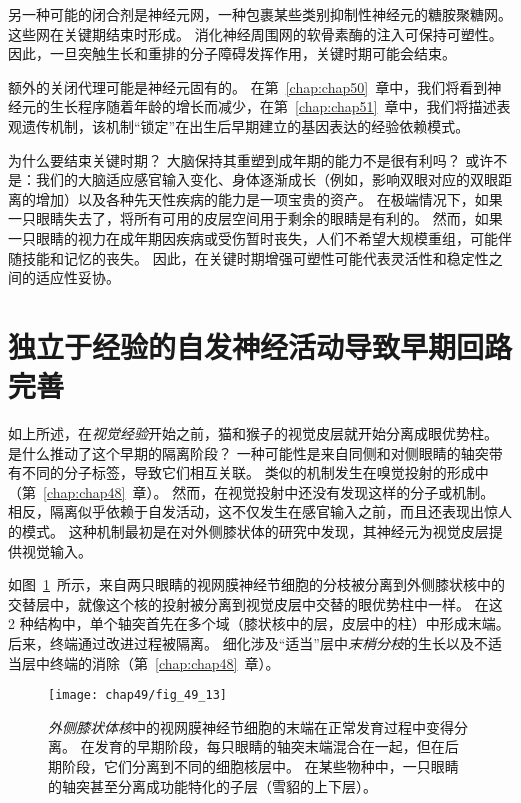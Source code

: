 另一种可能的闭合剂是神经元网，一种包裹某些类别抑制性神经元的糖胺聚糖网。
这些网在关键期结束时形成。
消化神经周围网的软骨素酶的注入可保持可塑性。
因此，一旦突触生长和重排的分子障碍发挥作用，关键时期可能会结束。


额外的关闭代理可能是神经元固有的。
在第~\ref{chap:chap50}~章中，我们将看到神经元的生长程序随着年龄的增长而减少，在第~\ref{chap:chap51}~章中，我们将描述表观遗传机制，该机制“锁定”在出生后早期建立的基因表达的经验依赖模式。


为什么要结束关键时期？
大脑保持其重塑到成年期的能力不是很有利吗？
或许不是：我们的大脑适应感官输入变化、身体逐渐成长（例如，影响双眼对应的双眼距离的增加）以及各种先天性疾病的能力是一项宝贵的资产。
在极端情况下，如果一只眼睛失去了，将所有可用的皮层空间用于剩余的眼睛是有利的。
然而，如果一只眼睛的视力在成年期因疾病或受伤暂时丧失，人们不希望大规模重组，可能伴随技能和记忆的丧失。
因此，在关键时期增强可塑性可能代表灵活性和稳定性之间的适应性妥协。



\section{独立于经验的自发神经活动导致早期回路完善}

如上所述，在\textit{视觉经验}开始之前，猫和猴子的视觉皮层就开始分离成眼优势柱。
是什么推动了这个早期的隔离阶段？
一种可能性是来自同侧和对侧眼睛的轴突带有不同的分子标签，导致它们相互关联。
类似的机制发生在嗅觉投射的形成中（第~\ref{chap:chap48}~章）。
然而，在视觉投射中还没有发现这样的分子或机制。
相反，隔离似乎依赖于自发活动，这不仅发生在感官输入之前，而且还表现出惊人的模式。
这种机制最初是在对外侧膝状体的研究中发现，其神经元为视觉皮层提供视觉输入。


如图~\ref{fig:49_13}~所示，来自两只眼睛的视网膜神经节细胞的分枝被分离到外侧膝状核中的交替层中，就像这个核的投射被分离到视觉皮层中交替的眼优势柱中一样。
在这 2 种结构中，单个轴突首先在多个域（膝状核中的层，皮层中的柱）中形成末端。
后来，终端通过改进过程被隔离。
细化涉及“适当”层中\textit{末梢分枝}的生长以及不适当层中终端的消除（第~\ref{chap:chap48}~章）。


\begin{figure}[htbp]
	\centering
	\texttt{[image: chap49/fig\_49\_13]}
	\caption{\textit{外侧膝状体核}中的视网膜神经节细胞的末端在正常发育过程中变得分离。
		在发育的早期阶段，每只眼睛的轴突末端混合在一起，但在后期阶段，它们分离到不同的细胞核层中。
		在某些物种中，一只眼睛的轴突甚至分离成功能特化的子层（雪貂的上下层）\cite{sanes1999formation}。}
	\label{fig:49_13}
\end{figure}


